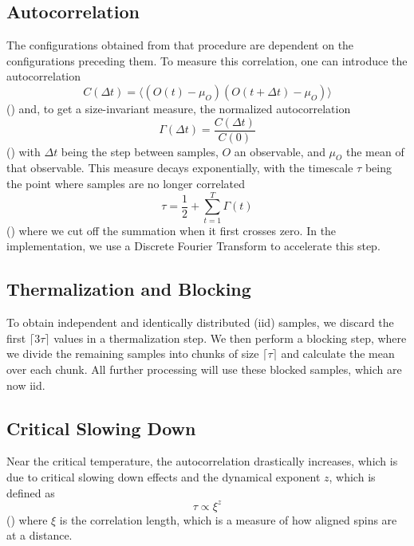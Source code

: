 	\subsection{Autocorrelation}
		The configurations obtained from that procedure are dependent on the configurations preceding them.  To measure this correlation, one can introduce the autocorrelation
		\begin{equation}
			C(\Delta t) = \langle(O(t) - \mu_O)(O(t + \Delta t) - \mu_O) \rangle
		\end{equation}
		(\citet[eq. (41)]{bootstrap}) and, to get a size-invariant measure, the normalized autocorrelation
		\begin{equation}
			\Gamma(\Delta t) = \frac{C(\Delta t)}{C(0)}
		\end{equation}
		(\citet[eq. (43)]{bootstrap}) with $\Delta t$ being the step between samples, $O$ an observable, and $\mu_O$ the mean of that observable. This measure decays exponentially, with the timescale $\tau$ being the point where samples are no longer correlated
		\begin{equation}
			\tau = \frac{1}{2} + \sum^{T}_{t=1}{\Gamma(t)}
		\end{equation}
		(\citet[eq. (46)]{bootstrap}) where we cut off the summation when it first crosses zero. In the implementation, we use a Discrete Fourier Transform to accelerate this step.
		
	\subsection{Thermalization and Blocking}\label{sec:blocking}
		To obtain independent and identically distributed (iid) samples, we discard the first $\lceil 3\tau \rceil$ values in a thermalization step. We then perform a blocking step, where we divide the remaining samples into chunks of size $\lceil \tau \rceil$ and calculate the mean over each chunk. All further processing will use these blocked samples, which are now iid.
		
	\subsection{Critical Slowing Down}\label{sec:theo:critical_slowing_down}
		Near the critical temperature, the autocorrelation drastically increases, which is due to critical slowing down effects and the dynamical exponent $z$, which is defined as
		\begin{equation}
			\tau \propto \xi^z
		\end{equation}
		(\citet[eq. (6)]{bootstrap}) where $\xi$ is the correlation length, which is a measure of how aligned spins are at a distance.
		
